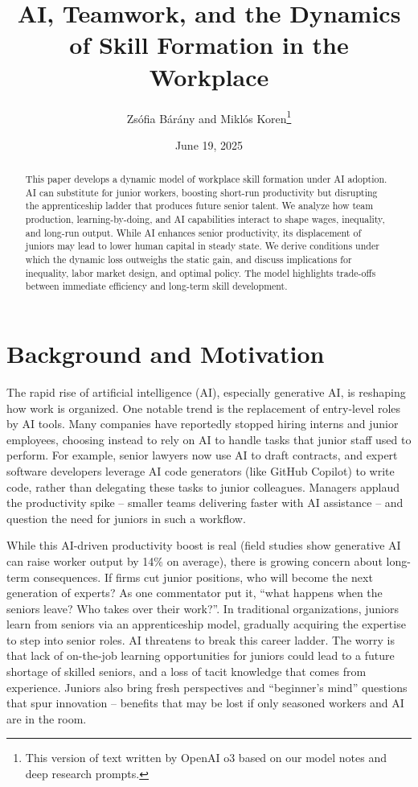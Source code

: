 \documentclass[12pt]{article}
\title{AI, Teamwork, and the Dynamics of Skill Formation in the Workplace}
\author{Zsófia Bárány and Miklós Koren\thanks{This version of text written by OpenAI o3 based on our model notes and deep research prompts.}}
\date{June 19, 2025}
\begin{document}
\maketitle
\begin{abstract}
This paper develops a dynamic model of workplace skill formation under AI adoption. AI can substitute for junior workers, boosting short-run productivity but disrupting the apprenticeship ladder that produces future senior talent. We analyze how team production, learning-by-doing, and AI capabilities interact to shape wages, inequality, and long-run output. While AI enhances senior productivity, its displacement of juniors may lead to lower human capital in steady state. We derive conditions under which the dynamic loss outweighs the static gain, and discuss implications for inequality, labor market design, and optimal policy. The model highlights trade-offs between immediate efficiency and long-term skill development.
\end{abstract}
\section{Background and Motivation}\label{background-and-motivation}

The rapid rise of artificial intelligence (AI), especially generative
AI, is reshaping how work is organized. One notable trend is the
{replacement of entry-level roles by AI tools}. Many companies
have reportedly stopped hiring interns and junior employees, choosing
instead to rely on AI to handle tasks that junior staff used to perform.
For example, {senior lawyers now use AI to draft contracts}, and
{expert software developers leverage AI code generators (like
GitHub Copilot) to write code}, rather than delegating these tasks to
junior colleagues. Managers applaud the productivity spike --
{smaller teams delivering faster with AI assistance} -- and
question the need for juniors in such a workflow.

While this {AI-driven productivity boost} is real (field studies
show generative AI can raise worker output by 14\% on average), there is
growing concern about {long-term consequences}. If firms cut
junior positions, {who will become the next generation of experts?}
As one commentator put it, {``what happens when the seniors leave?
Who takes over their work?''}. In traditional organizations, juniors
learn from seniors via an {apprenticeship model}, gradually
acquiring the expertise to step into senior roles. AI threatens to break
this {career ladder}. The worry is that {lack of
on-the-job learning opportunities} for juniors could lead to a future
shortage of skilled seniors, and a loss of tacit knowledge that comes
from experience. Juniors also bring fresh perspectives and ``beginner's
mind'' questions that spur innovation -- benefits that may be lost if
only seasoned workers and AI are in the room.
\end{document}
